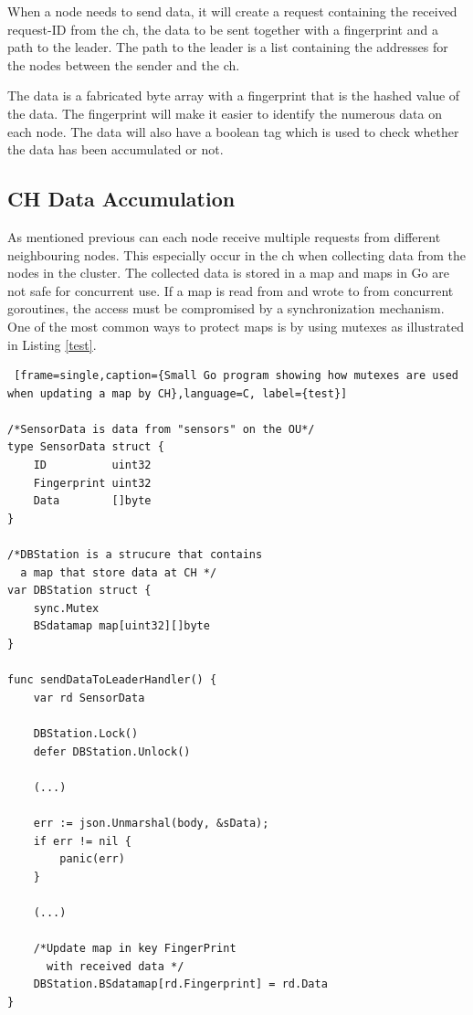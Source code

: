 \documentclass[USenglish]{uit-thesis}
\begin{document}
When a node needs to send data, it will create a request containing the received request-ID from the \gls{ch}, the data to be sent together with a fingerprint and a path to the leader. The path to the leader is a list containing the addresses for the nodes between the sender and the \gls{ch}.

The data is a fabricated byte array with a fingerprint that is the hashed value of the data. The fingerprint will make it easier to identify the numerous data on each node. The data will also have a boolean tag which is used to check whether the data has been accumulated or not.

\subsection{CH Data Accumulation}
As mentioned previous can each node receive multiple requests from different neighbouring nodes.
This especially occur in the \gls{ch} when collecting data from the nodes in the cluster. The collected data is stored in a map and maps in Go are not safe for concurrent use. If a map is read from and wrote to from concurrent goroutines, the access must be compromised by a synchronization mechanism. One of the most common ways to protect maps is by using mutexes as illustrated in Listing \ref{test}.

\newpage

\begin{lstlisting} [frame=single,caption={Small Go program showing how mutexes are used when updating a map by CH},language=C, label={test}]

/*SensorData is data from "sensors" on the OU*/
type SensorData struct {
	ID          uint32
	Fingerprint uint32
	Data        []byte
}

/*DBStation is a strucure that contains 
  a map that store data at CH */
var DBStation struct {
	sync.Mutex
	BSdatamap map[uint32][]byte
}

func sendDataToLeaderHandler() {
	var rd SensorData
	
	DBStation.Lock()
	defer DBStation.Unlock()
	
	(...)
	
	err := json.Unmarshal(body, &sData); 
	if err != nil {
		panic(err)
	}
	
	(...)
	
	/*Update map in key FingerPrint
	  with received data */
	DBStation.BSdatamap[rd.Fingerprint] = rd.Data
}
\end{lstlisting}
\end{document}
